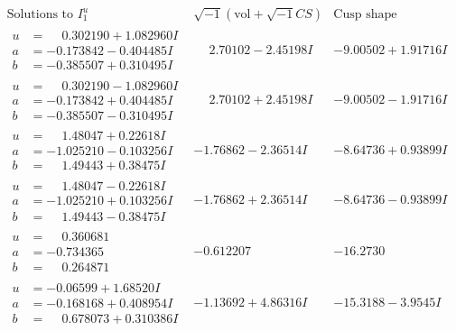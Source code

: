 \documentclass[1p]{elsarticle_modified}
\theoremstyle{definition}
\newcommand{\I}{\sqrt{-1}}
\begin{document}
$$\begin{array}{c|c|c}  
\text{Solutions to }I^u_{1}& \I (\text{vol} + \sqrt{-1}CS) & \text{Cusp shape}\\
 \hline 
\begin{aligned}
u &= \phantom{-}0.302190 + 1.082960 I \\
a &= -0.173842 - 0.404485 I \\
b &= -0.385507 + 0.310495 I\end{aligned}
 & \phantom{-}2.70102 - 2.45198 I & -9.00502 + 1.91716 I \\ \hline\begin{aligned}
u &= \phantom{-}0.302190 - 1.082960 I \\
a &= -0.173842 + 0.404485 I \\
b &= -0.385507 - 0.310495 I\end{aligned}
 & \phantom{-}2.70102 + 2.45198 I & -9.00502 - 1.91716 I \\ \hline\begin{aligned}
u &= \phantom{-}1.48047 + 0.22618 I \\
a &= -1.025210 - 0.103256 I \\
b &= \phantom{-}1.49443 + 0.38475 I\end{aligned}
 & -1.76862 - 2.36514 I & -8.64736 + 0.93899 I \\ \hline\begin{aligned}
u &= \phantom{-}1.48047 - 0.22618 I \\
a &= -1.025210 + 0.103256 I \\
b &= \phantom{-}1.49443 - 0.38475 I\end{aligned}
 & -1.76862 + 2.36514 I & -8.64736 - 0.93899 I \\ \hline\begin{aligned}
u &= \phantom{-}0.360681\phantom{ +0.000000I} \\
a &= -0.734365\phantom{ +0.000000I} \\
b &= \phantom{-}0.264871\phantom{ +0.000000I}\end{aligned}
 & -0.612207\phantom{ +0.000000I} & -16.2730\phantom{ +0.000000I} \\ \hline\begin{aligned}
u &= -0.06599 + 1.68520 I \\
a &= -0.168168 + 0.408954 I \\
b &= \phantom{-}0.678073 + 0.310386 I\end{aligned}
 & -1.13692 + 4.86316 I & -15.3188 - 3.9545 I \\ \hline\begin{aligned}

\end{aligned}
\end{array}$$
\end{document}
